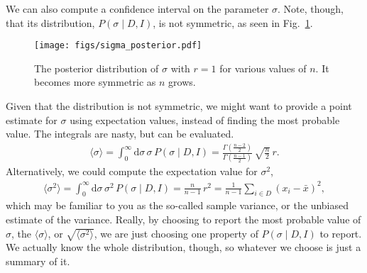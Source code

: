 We can also compute a confidence interval on the parameter $\sigma$.
Note, though, that its distribution, $P(\sigma \mid D, I)$, is not
symmetric, as seen in Fig.~\ref{fig:l02_sigma_post}.

\begin{figure}[h]
\centerline{
        \texttt{[image: figs/sigma\_posterior.pdf]}}
      \caption{The posterior distribution of $\sigma$ with $r = 1$ for
        various values of $n$.  It becomes more symmetric as $n$ grows.}
\label{fig:l02_sigma_post}
\end{figure}

Given that the distribution is not symmetric, we might want to provide a point estimate for $\sigma$ using expectation values, instead of finding the most probable value. The integrals are nasty, but can be evaluated.
\begin{align}
    \langle \sigma \rangle = \int_0^\infty \mathrm{d}\sigma\,\sigma\,P(\sigma\mid D, I)
     = \frac{\Gamma\left(\frac{n-2}{2}\right)}{\Gamma\left(\frac{n-1}{2}\right)}\,\sqrt{\frac{n}{2}}\,r.
\end{align}
Alternatively, we could compute the expectation value for $\sigma^2$,
\begin{align}
    \langle \sigma^2 \rangle = \int_0^\infty \mathrm{d}\sigma\,\sigma^2\,P(\sigma\mid D, I)
     = \frac{n}{n-1}\,r^2 = \frac{1}{n-1}\sum_{i \in D}(x_i - \bar{x})^2,
 \end{align}
which may be familiar to you as the so-called sample variance, or the unbiased estimate of the variance. Really, by choosing to report the most probable value of $\sigma$, the $\langle \sigma \rangle$, or $\sqrt{\langle \sigma^2\rangle}$, we are just choosing one property of $P(\sigma\mid D, I)$ to report. We actually know the whole distribution, though, so whatever we choose is just a summary of it.
